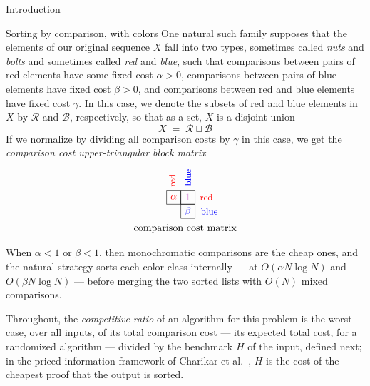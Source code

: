 \documentclass[11pt]{article}
\newcommand{\sq}[3]{%
  \draw ({(#2-1)*0.5},{-(#1-1)*0.5}) rectangle ++(0.5,-0.5);
  \node at ({(#2-0.5)*0.5},{-(#1-0.5)*0.5}) {#3};%
}
\theoremstyle{definition}
\numberwithin{equation}{section}
\begin{document}
\begin{section}{Introduction}
\begin{humanblock}
\begin{subsection}{Sorting by comparison, with colors}
One natural such family supposes that the elements of our original sequence $X$ fall into two types, sometimes called {\em nuts} and {\em bolts} and sometimes called {\em red} and {\em blue}, such that comparisons between pairs of red elements have some fixed cost $\alpha>0$, comparisons between pairs of blue elements have fixed cost $\beta>0$, and comparisons between red and blue elements have fixed cost $\gamma$. In this case, we denote the subsets of red and blue elements in $X$ by $\mathcal{R}$ and $\mathcal{B}$, respectively, so that as a set, $X$ is a disjoint union
$$
X\;=\;\mathcal{R}\sqcup\mathcal{B}
$$
If we normalize by dividing all comparison costs by $\gamma$ in this case, we get the {\em comparison cost upper-triangular block matrix}
$$
\begin{array}{c}
\ \ \ \ \ 
\begin{tikzpicture}
  \sq{1}{1}{{\color{red} $\alpha$}}  \sq{1}{2}{{\color{plum} $1$}}
                       \sq{2}{2}{{\color{blue} $\beta$}}
  \node[rotate=90] at (0.2,0.35) {{\color{red}\small red}};
  \node[rotate=90] at (0.75,0.45) {{\color{blue}\small blue}};
  \node at (1.4,-0.25) {{\color{red}\small red}};
  \node at (1.5,-0.75) {{\color{blue}\small blue}};
\end{tikzpicture}\\
\text{comparison cost matrix}
\end{array}
$$

When $\alpha<1$ or $\beta<1$, then monochromatic comparisons are the
cheap ones, and the natural strategy sorts each color class
internally --- at $O(\alpha N \log N)$ and $O(\beta N \log N)$ --- before merging the two sorted lists with $O(N)$ mixed comparisons.

Throughout, the {\em competitive ratio} of an algorithm for this problem is the worst case, over all inputs, of its total comparison cost --- its expected total cost, for a randomized algorithm --- divided by the benchmark $H$ of the input, defined next; in the priced-information framework of Charikar et al.~\cite{charikar2000query}, $H$ is the cost of the cheapest proof that the output is sorted.


\end{subsection}
\end{humanblock}
\end{section}
\end{document}
